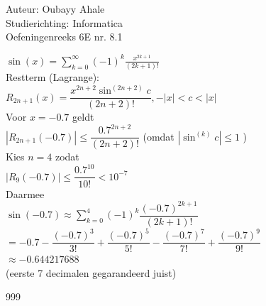 \documentclass[a4paper]{article}
\begin{document}
    
    \noindent \large Auteur: Oubayy Ahale       \\
    \noindent \large Studierichting: Informatica\\
    \noindent \large Oefeningenreeks 6E nr. 8.1 \\
    
    \medskip
    
    \normalsize
    
    $ \sin(x) = \displaystyle\sum\limits_{k=0}^{\infty} (-1)^{k} \frac{x^{2k+1}}{(2k+1)!}$\\

    Restterm (Lagrange):\\

    $ R_{2n+1}(x) = \dfrac{x^{2n+2} \sin^{(2n+2)}c}{(2n+2)!}, -|x|<c<|x| $\\

    Voor $x=-0.7$ geldt\\

    $ |R_{2n+1}(-0.7)| \le \dfrac{0.7^{2n+2}}{(2n+2)!} $ (omdat $|\sin^{(k)}c| \le 1$ ) \\

    Kies $n=4$ zodat\\

    $ |R_{9}(-0.7)| \le \dfrac{0.7^{10}}{10!}<10^{-7} $\\

    Daarmee\\

    $ \sin(-0.7) \approx \displaystyle\sum_{k=0}^{4} (-1)^{k} \dfrac{(-0.7)^{2k+1}}{(2k+1)!} $\\

    $ = -0.7 - \dfrac{(-0.7)^{3}}{3!} + \dfrac{(-0.7)^{5}}{5!} - \dfrac{(-0.7)^{7}}{7!} + \dfrac{(-0.7)^{9}}{9!} $\\

    $ \approx -0.644217688$\\

    (eerste 7 decimalen gegarandeerd juist)\\
    
    \begin{thebibliography}{999}
    \end{thebibliography}
    
\end{document}
